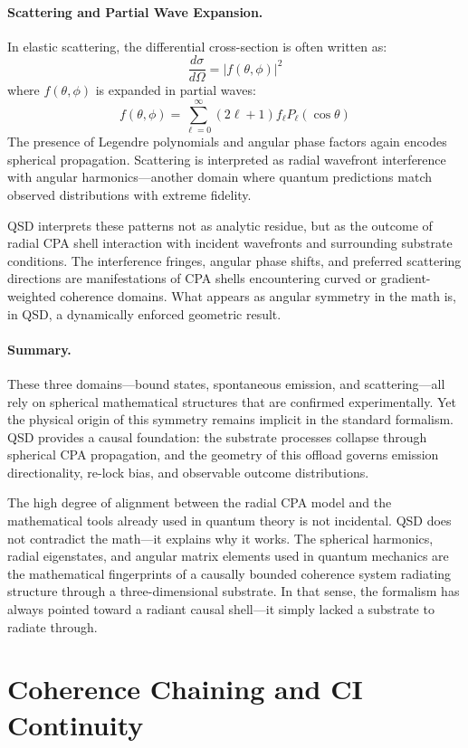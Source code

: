 \documentclass[preprints,article,submit,pdftex,moreauthors]{Definitions/mdpi}
\begin{document}
\paragraph{Scattering and Partial Wave Expansion.}
In elastic scattering, the differential cross-section is often written as:
\[
\frac{d\sigma}{d\Omega} = \left| f(\theta, \phi) \right|^2
\]
where \( f(\theta, \phi) \) is expanded in partial waves:
\[
f(\theta, \phi) = \sum_{\ell=0}^{\infty} (2\ell + 1) f_\ell P_\ell(\cos\theta)
\]
The presence of Legendre polynomials and angular phase factors again encodes spherical propagation. Scattering is interpreted as radial wavefront interference with angular harmonics—another domain where quantum predictions match observed distributions with extreme fidelity.

QSD interprets these patterns not as analytic residue, but as the outcome of radial CPA shell interaction with incident wavefronts and surrounding substrate conditions. The interference fringes, angular phase shifts, and preferred scattering directions are manifestations of CPA shells encountering curved or gradient-weighted coherence domains. What appears as angular symmetry in the math is, in QSD, a dynamically enforced geometric result.

\paragraph{Summary.}
These three domains—bound states, spontaneous emission, and scattering—all rely on spherical mathematical structures that are confirmed experimentally. Yet the physical origin of this symmetry remains implicit in the standard formalism. QSD provides a causal foundation: the substrate processes collapse through spherical CPA propagation, and the geometry of this offload governs emission directionality, re-lock bias, and observable outcome distributions.

The high degree of alignment between the radial CPA model and the mathematical tools already used in quantum theory is not incidental. QSD does not contradict the math—it explains why it works. The spherical harmonics, radial eigenstates, and angular matrix elements used in quantum mechanics are the mathematical fingerprints of a causally bounded coherence system radiating structure through a three-dimensional substrate. In that sense, the formalism has always pointed toward a radiant causal shell—it simply lacked a substrate to radiate through.


\section{Coherence Chaining and CI Continuity}
\end{document}

